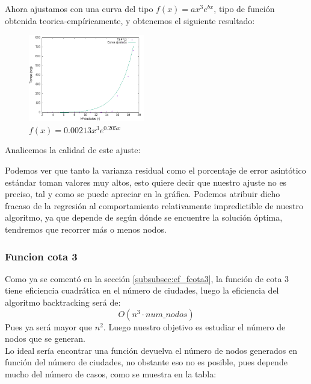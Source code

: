 \documentclass{article}
\begin{document}
Ahora ajustamos con una curva del tipo $f(x)=a x^3 e^{b x}$, tipo de función obtenida teorica-empíricamente, y obtenemos el siguiente resultado: 

\begin{figure}[H]
    \centering
    \includegraphics[width=0.45\textwidth]{Sucio_Olga/DatosBK/CurvaAjustadaExponencial.png}
    \caption*{$f(x)=0.00213 x^3 e^{0.205x}$}
\end{figure}

Analicemos la calidad de este ajuste: 


Podemos ver que tanto la varianza residual como el porcentaje de error asintótico estándar toman valores muy altos, esto quiere decir que nuestro ajuste no es preciso, tal y como se puede apreciar en la gráfica. Podemos atribuir dicho fracaso de la regresión al comportamiento relativamente impredictible de nuestro algoritmo, ya que depende de según dónde se encuentre la solución óptima, tendremos que recorrer más o menos nodos. 

\subsubsection{Funcion cota 3} \label{subsubsection:nodes_f_cota3}

Como ya se comentó en la sección \ref{subsubsec:ef_fcota3}, la función de cota 3 tiene eficiencia cuadrática en el número de ciudades, luego la eficiencia del algoritmo backtracking será de:
\[
    O(n^3 \cdot num\_nodos)
\]
Pues ya será mayor que $n^2$. Luego nuestro objetivo es estudiar el número de nodos que se generan. \\
Lo ideal sería encontrar una función devuelva el número de nodos generados en función del número de ciudades, no obstante eso no es posible, pues depende mucho del número de casos, como se muestra en la tabla:
\end{document}
